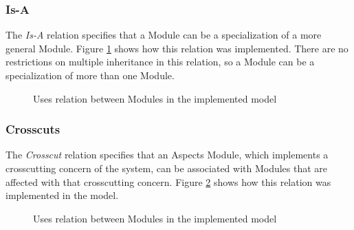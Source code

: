 \subsubsection{Is-A}

The \textit{Is-A} relation specifies that a Module can be a specialization of a more general Module. Figure \ref{figure:modelIsARelation} shows how this relation was implemented. There are no restrictions on multiple inheritance in this relation, so a Module can be a specialization of more than one Module. 

\begin{figure}[h]
\centering
\renewcommand {\umltextcolor}{black}
\renewcommand {\umlfillcolor}{none}
\renewcommand {\umldrawcolor}{black}
\caption{Uses relation between Modules in the implemented model}
\label{figure:modelIsARelation}
\end{figure}

\subsubsection{Crosscuts}

The \textit{Crosscut} relation specifies that an Aspects Module, which implements a crosscutting concern of the system, can be associated with Modules that are affected with that crosscutting concern. Figure \ref{figure:modelCrosscutsRelation} shows how this relation was implemented in the model.

\begin{figure}[h]
\centering
\renewcommand {\umltextcolor}{black}
\renewcommand {\umlfillcolor}{none}
\renewcommand {\umldrawcolor}{black}
\caption{Uses relation between Modules in the implemented model}
\label{figure:modelCrosscutsRelation}
\end{figure}

